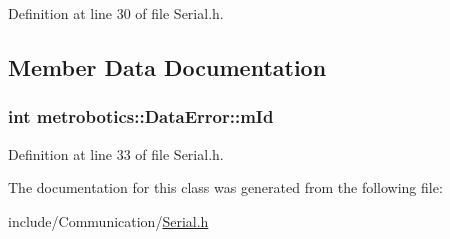\-Definition at line 30 of file \-Serial.\-h.



\subsection{\-Member \-Data \-Documentation}
\hypertarget{classmetrobotics_1_1DataError_a2bb599c7e444359c76c5be1ae8acd8f5}{
\subsubsection[{m\-Id}]{\setlength{\rightskip}{0pt plus 5cm}int {\bf metrobotics\-::\-Data\-Error\-::m\-Id}}}\label{classmetrobotics_1_1DataError_a2bb599c7e444359c76c5be1ae8acd8f5}


\-Definition at line 33 of file \-Serial.\-h.



\-The documentation for this class was generated from the following file\-:\begin{DoxyCompactItemize}
\item 
include/\-Communication/\hyperlink{Serial_8h}{\-Serial.\-h}\end{DoxyCompactItemize}
